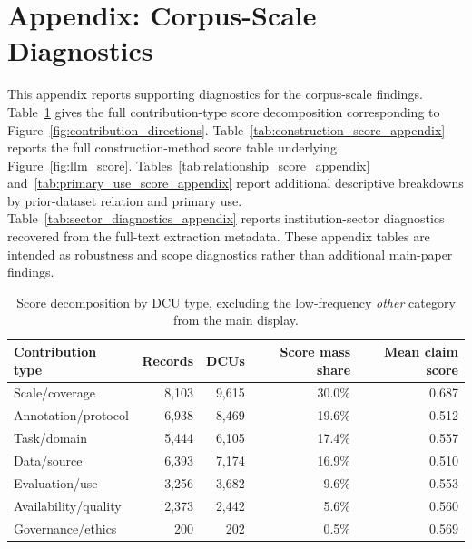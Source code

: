 \documentclass[11pt]{article}
\begin{document}
\section{Appendix: Corpus-Scale Diagnostics}
\label{app:corpus_diagnostics}

This appendix reports supporting diagnostics for the corpus-scale findings.
Table~\ref{tab:dcu_type_score_appendix} gives the full contribution-type score decomposition corresponding to Figure~\ref{fig:contribution_directions}.
Table~\ref{tab:construction_score_appendix} reports the full construction-method score table underlying Figure~\ref{fig:llm_score}.
Tables~\ref{tab:relationship_score_appendix} and~\ref{tab:primary_use_score_appendix} report additional descriptive breakdowns by prior-dataset relation and primary use.
Table~\ref{tab:sector_diagnostics_appendix} reports institution-sector diagnostics recovered from the full-text extraction metadata.
These appendix tables are intended as robustness and scope diagnostics rather than additional main-paper findings.
\begin{table}[h]
\centering
\small
\setlength{\tabcolsep}{4pt}
\begin{tabular}{lrrrr}
\toprule
Contribution type & Records & DCUs & Score mass share & Mean claim score \\
\midrule
Scale/coverage & 8,103 & 9,615 & 30.0\% & 0.687 \\
Annotation/protocol & 6,938 & 8,469 & 19.6\% & 0.512 \\
Task/domain & 5,444 & 6,105 & 17.4\% & 0.557 \\
Data/source & 6,393 & 7,174 & 16.9\% & 0.510 \\
Evaluation/use & 3,256 & 3,682 & 9.6\% & 0.553 \\
Availability/quality & 2,373 & 2,442 & 5.6\% & 0.560 \\
Governance/ethics & 200 & 202 & 0.5\% & 0.569 \\
\bottomrule
\end{tabular}
\caption{Score decomposition by DCU type, excluding the low-frequency \emph{other} category from the main display.}
\label{tab:dcu_type_score_appendix}
\end{table}
\end{document}
